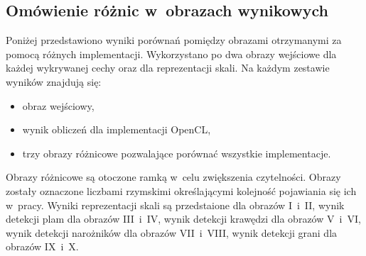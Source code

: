 \subsection{Omówienie różnic w~obrazach wynikowych}
\label{subsec:prezentacjaObrazowRoznicowych}

Poniżej przedstawiono wyniki porównań pomiędzy obrazami otrzymanymi za pomocą różnych implementacji. Wykorzystano po dwa obrazy wejściowe dla każdej wykrywanej cechy oraz dla reprezentacji skali. Na każdym zestawie wyników znajdują się:
\begin{itemize}
\item obraz wejściowy,
\item wynik obliczeń dla implementacji OpenCL,
\item trzy obrazy różnicowe pozwalające porównać wszystkie implementacje.
\end{itemize}

Obrazy różnicowe są otoczone ramką w~celu zwiększenia czytelności. Obrazy zostały oznaczone liczbami rzymskimi określającymi kolejność pojawiania się ich w~pracy. Wyniki reprezentacji skali są przedstaione dla obrazów I~i~II, wynik detekcji plam dla obrazów III~i~IV, wynik detekcji krawędzi dla obrazów V~i~VI, wynik detekcji narożników dla obrazów VII~i~VIII, wynik detekcji grani dla obrazów IX~i~X.

